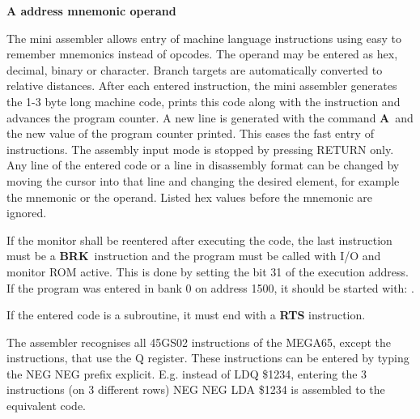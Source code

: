 \begin{description}[leftmargin=2cm,style=nextline]
\item [Format:] {\bf A address mnemonic operand}
\item [Usage:] The mini assembler allows entry of machine language instructions
               using easy to remember mnemonics instead of opcodes.
               The operand may be entered as hex, decimal, binary or character.
               Branch targets are automatically converted to relative distances.
               After each entered instruction, the mini assembler generates
               the 1-3 byte long machine code, prints this code along with the
               instruction and advances the program counter. A new line
               is generated with the command {\bf A} and the new value of the
               program counter printed. This eases the fast entry of instructions.
               The assembly input mode is stopped by pressing RETURN only.
               Any line of the entered code or a line in disassembly format
               can be changed by moving the cursor into that line and changing
               the desired element, for example the mnemonic or the operand.
               Listed hex values before the mnemonic are ignored.

               If the monitor shall be reentered after executing the code,
               the last instruction must be a {\bf BRK} instruction
               and the program must be called with I/O and monitor ROM active.
               This is done by setting the bit 31 of the execution address.
               If the program was entered in bank 0 on address 1500,
               it should be started with: .

               If the entered code is a subroutine, it must end with a
               {\bf RTS} instruction.

\item [Remarks:] The assembler recognises all 45GS02 instructions of the
                 MEGA65, except the instructions, that use the Q register.
                 These instructions can be entered by typing
                 the NEG NEG prefix explicit. E.g. instead of LDQ \$1234,
                 entering the 3 instructions (on 3 different rows)
                 NEG NEG LDA \$1234 is assembled to the equivalent code.

\end{description}
